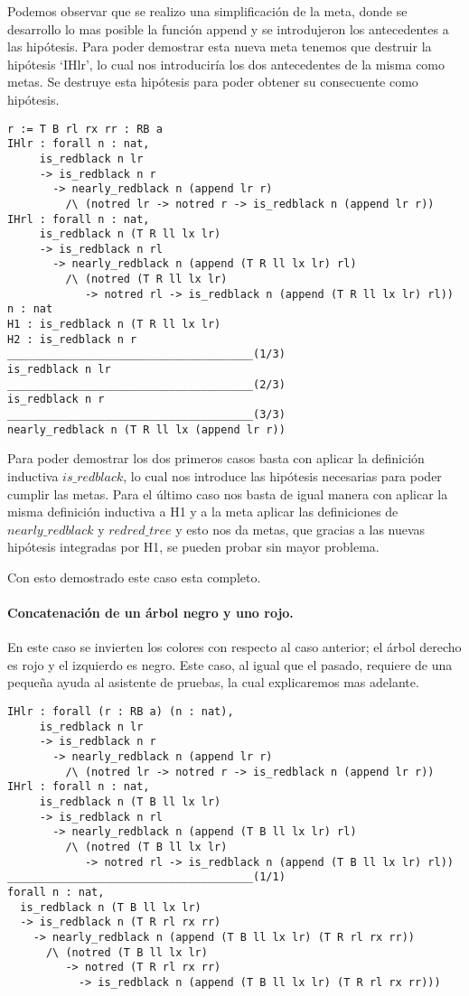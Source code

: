 Podemos observar que se realizo una simplificaci\'on de la meta, donde se desarrollo lo mas
posible la funci\'on append y se introdujeron los antecedentes a las hip\'otesis. Para poder
demostrar esta nueva meta tenemos que destruir la hipótesis `IHlr', lo cual nos introduciría los
dos antecedentes de la misma como metas. Se destruye esta hipótesis para poder obtener su consecuente como hip\'otesis.

\begin{verbatim}
r := T B rl rx rr : RB a
IHlr : forall n : nat,
     is_redblack n lr
     -> is_redblack n r
       -> nearly_redblack n (append lr r)
         /\ (notred lr -> notred r -> is_redblack n (append lr r))
IHrl : forall n : nat,
     is_redblack n (T R ll lx lr)
     -> is_redblack n rl
       -> nearly_redblack n (append (T R ll lx lr) rl)
         /\ (notred (T R ll lx lr)
            -> notred rl -> is_redblack n (append (T R ll lx lr) rl))
n : nat
H1 : is_redblack n (T R ll lx lr)
H2 : is_redblack n r
______________________________________(1/3)
is_redblack n lr
______________________________________(2/3)
is_redblack n r
______________________________________(3/3)
nearly_redblack n (T R ll lx (append lr r))
\end{verbatim}

Para poder demostrar los dos primeros casos basta con aplicar la definici\'on inductiva
$is\_redblack$, lo cual nos introduce las hipótesis necesarias para poder cumplir las metas.
Para el \'ultimo caso nos basta de igual manera con aplicar la misma definici\'on inductiva a H1 y
a la meta aplicar las definiciones de $nearly\_redblack$ y $redred\_tree$ y esto nos da metas, que
gracias a las nuevas hip\'otesis integradas por H1, se pueden probar sin mayor problema.

Con esto demostrado este caso esta completo.

\paragraph{Concatenaci\'on de un \'arbol negro y uno rojo.}

En este caso se invierten los colores con respecto al caso anterior; el \'arbol derecho es rojo y
el izquierdo es negro. Este caso, al igual que el pasado, requiere de una pequeña ayuda al
asistente de pruebas, la cual explicaremos mas adelante.

\begin{verbatim}
IHlr : forall (r : RB a) (n : nat),
     is_redblack n lr
     -> is_redblack n r
       -> nearly_redblack n (append lr r)
         /\ (notred lr -> notred r -> is_redblack n (append lr r))
IHrl : forall n : nat,
     is_redblack n (T B ll lx lr)
     -> is_redblack n rl
       -> nearly_redblack n (append (T B ll lx lr) rl)
         /\ (notred (T B ll lx lr)
            -> notred rl -> is_redblack n (append (T B ll lx lr) rl))
______________________________________(1/1)
forall n : nat,
  is_redblack n (T B ll lx lr)
  -> is_redblack n (T R rl rx rr)
    -> nearly_redblack n (append (T B ll lx lr) (T R rl rx rr))
      /\ (notred (T B ll lx lr)
         -> notred (T R rl rx rr)
           -> is_redblack n (append (T B ll lx lr) (T R rl rx rr)))
\end{verbatim}

